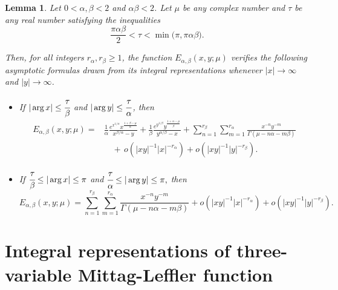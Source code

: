 \documentclass[12pt, reqno]{amsart}
\newtheorem{lemma}[theorem]{Lemma}
\theoremstyle{definition}
\theoremstyle{remark}
\numberwithin{equation}{section}
\begin{document}
\begin{lemma}\cite{Lavault}\label{l2.3}
    Let $0<\alpha,\beta<2$ and $\alpha\beta<2$. Let $\mu$ be any complex number and
$\tau$ be any real number satisfying the inequalities
\begin{equation}
\frac{\pi\alpha\beta}{2}
<
\tau
<
\min\!\bigl(\pi,\pi\alpha\beta\bigr).
\end{equation}

Then, for all integers $r_{\alpha},r_{\beta}\geq 1$, the function
$E_{\alpha,\beta}(x,y;\mu)$ verifies the following asymptotic formulas
drawn from its integral representations whenever $|x|\to\infty$ and
$|y|\to\infty$.
\begin{itemize}
    \item 
If  $|\arg x|\le \cfrac{\tau}{\beta}
$ and 
$|\arg y|\le \cfrac{\tau}{\alpha}$,
then
\[
\begin{aligned}
E_{\alpha,\beta}(x,y;\mu)
={}&
\frac{1}{\alpha}
\frac{e^{x^{1/\alpha}}
x^{\frac{1+\beta-\mu}{\alpha}}}
{x^{\beta/\alpha}-y}
+
\frac{1}{\beta}
\frac{e^{y^{1/\beta}}
y^{\frac{1+\alpha-\mu}{\beta}}}
{y^{\alpha/\beta}-x}
+
\sum_{n=1}^{r_{\beta}}
\sum_{m=1}^{r_{\alpha}}
\frac{x^{-n}y^{-m}}
{\Gamma(\mu-n\alpha-m\beta)}
\\[2mm]
&\quad
+\,o\!\left(|xy|^{-1}|x|^{-r_{\alpha}}\right)
+o\!\left(|xy|^{-1}|y|^{-r_{\beta}}\right).
\end{aligned}
\]

\item If 
$\cfrac{\tau}{\beta}\leq|\arg x|\le \pi$
and $\cfrac{\tau}{\alpha}\leq|\arg y|\le \pi,$ then
\[
E_{\alpha,\beta}(x,y;\mu)
=
\sum_{n=1}^{r_{\beta}}
\sum_{m=1}^{r_{\alpha}}
\frac{x^{-n}y^{-m}}
{\Gamma(\mu-n\alpha-m\beta)}
+
o\!\left(|xy|^{-1}|x|^{-r_{\alpha}}\right)
+
o\!\left(|xy|^{-1}|y|^{-r_{\beta}}\right).
\]
\end{itemize}

\end{lemma}





        
\section{Integral representations of three-variable Mittag-Leffler function}\label{sec3}
\end{document}
